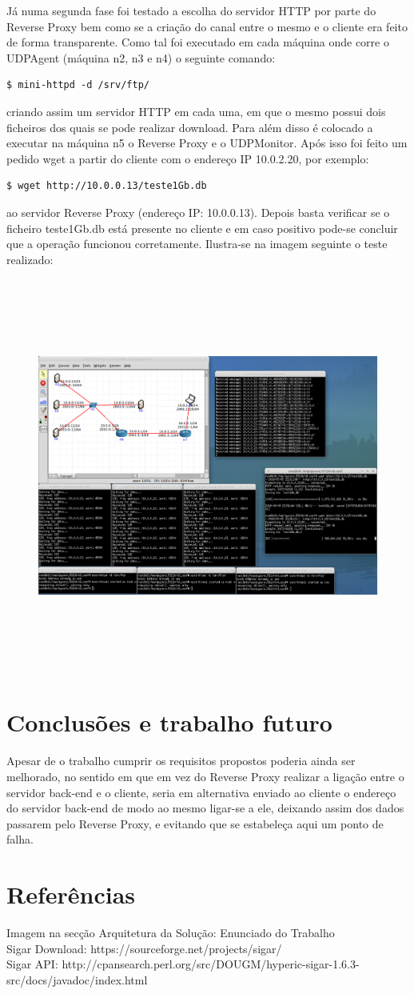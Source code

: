 \documentclass{article}
\begin{document}
Já numa segunda fase foi testado a escolha do servidor HTTP por parte do Reverse Proxy bem como se a criação do canal entre o mesmo e o cliente era feito de forma transparente.
Como tal foi executado em cada máquina onde corre o UDPAgent (máquina n2, n3 e n4) o seguinte comando:
\begin{verbatim}
$ mini-httpd -d /srv/ftp/
\end{verbatim}
criando assim um servidor HTTP em cada uma, em que o mesmo possui dois ficheiros dos quais se pode realizar download. Para além disso é colocado a executar na máquina n5 o Reverse Proxy e o UDPMonitor.
Após isso foi feito um pedido wget a partir do cliente com o endereço IP 10.0.2.20, por exemplo:
\begin{verbatim}
$ wget http://10.0.0.13/teste1Gb.db
\end{verbatim}
ao servidor Reverse Proxy (endereço IP: 10.0.0.13). Depois basta verificar se o ficheiro teste1Gb.db está presente no cliente e em caso positivo pode-se concluir que a operação funcionou corretamente. Ilustra-se na imagem seguinte o teste realizado:
\begin{figure}[H]
	\advance\leftskip-3cm
    \includegraphics[height=13cm]{teste2.png}
\end{figure}

\section{Conclusões e trabalho futuro}
Apesar de o trabalho cumprir os requisitos propostos poderia ainda ser melhorado, no sentido em que em vez do Reverse Proxy realizar a ligação entre o servidor back-end e o cliente, seria em alternativa enviado ao cliente o endereço do servidor back-end de modo ao mesmo ligar-se a ele, deixando assim dos dados passarem pelo Reverse Proxy, e evitando que se estabeleça aqui um ponto de falha.

\section{Referências}
Imagem na secção Arquitetura da Solução: Enunciado do Trabalho\\
Sigar Download: https://sourceforge.net/projects/sigar/\\
Sigar API: http://cpansearch.perl.org/src/DOUGM/hyperic-sigar-1.6.3-src/docs/javadoc/index.html\\
\end{document}

